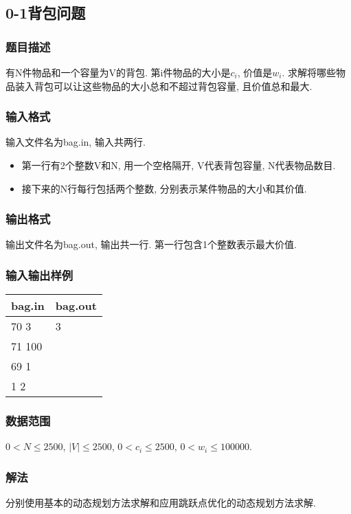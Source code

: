 \subsection{0-1背包问题}
\subsubsection{题目描述}
有N件物品和一个容量为V的背包. 第i件物品的大小是$c_i$, 价值是$w_i$.
求解将哪些物品装入背包可以让这些物品的大小总和不超过背包容量, 且价值总和最大.
\subsubsection{输入格式}
输入文件名为bag.in, 输入共两行.

\begin{itemize}
	\item 第一行有2个整数V和N, 用一个空格隔开, V代表背包容量, N代表物品数目.
	\item 接下来的N行每行包括两个整数, 分别表示某件物品的大小和其价值.
\end{itemize}

\subsubsection{输出格式}
输出文件名为bag.out, 输出共一行.
第一行包含1个整数表示最大价值.
\subsubsection{输入输出样例}
\label{sec:iosample}
\begin{table}[h!]
	\centering
	\begin{tabular}{|l|l|}
		\hline
		bag.in & bag.out \\
		\hline
		70 3   & 3       \\
		71 100 & ~       \\
		69 1   & ~       \\
		1 2    & ~       \\
		\hline
	\end{tabular}
\end{table}

\subsubsection{数据范围}
$0 < N \leq 2500$,
$| V | \leq 2500$,
$0 < c_i \leq 2500$,
$0 < w_i \leq 100000$.

\subsubsection{解法}
分别使用基本的动态规划方法求解和应用跳跃点优化的动态规划方法求解.

